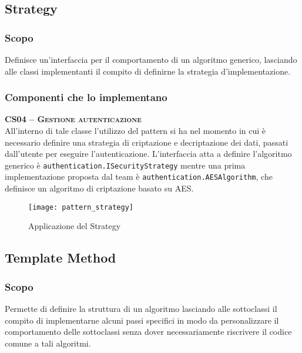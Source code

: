 \subsection{Strategy}\label{sec:patternstrategy}

\subsubsection{Scopo}
Definisce un'interfaccia per il comportamento di un algoritmo generico, lasciando alle classi implementanti il compito di definirne la strategia d'implementazione.

\subsubsection{Componenti che lo implementano}
\begin{description}

  \item{\scshape\bfseries CS04 -- Gestione autenticazione}\\
All'interno di tale classe l'utilizzo del pattern si ha nel momento in cui è necessario definire una strategia di criptazione e decriptazione dei dati, passati dall'utente per eseguire l'autenticazione. L'interfaccia atta a definire l'algoritmo generico è \texttt{authentication.ISecurityStrategy} mentre una prima implementazione proposta dal team è \texttt{authentication.AESAlgorithm}, che definisce un algoritmo di criptazione basato su AES.



\begin{figure}[H]
  \centering
  \texttt{[image: pattern\_strategy]}
  \caption{Applicazione del  Strategy}\label{fig:strategy}
\end{figure}

\end{description}

\subsection{Template Method}
\subsubsection{Scopo}
Permette di definire la struttura di un algoritmo lasciando alle sottoclassi il compito di implementarne alcuni passi specifici in modo da personalizzare il comportamento delle sottoclassi senza dover necessariamente riscrivere il codice comune a tali algoritmi.


